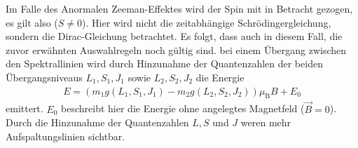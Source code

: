 Im Falle des Anormalen Zeeman-Effektes wird der Spin mit in Betracht gezogen, es
gilt also ($S \neq \num{0}$). Hier wird nicht die zeitabhängige Schrödingergleichung,
sondern die Dirac-Gleichung betrachtet. Es folgt, dass auch in diesem Fall, die
zuvor erwähnten Auswahlregeln noch gültig sind.
bei einem Übergang zwischen den Spektrallinien wird durch Hinzunahme der Quantenzahlen
der beiden Übergangsniveaus $L_1, S_1, J_1$ sowie $L_2, S_2, J_2$  die Energie
\begin{align}
  E = \left(m_1 g(L_1, S_1, J_1) - m_2 g(L_2, S_2, J_2) \right)\mu_\text{B} B + E_0
\end{align}
emittert. $E_0$ beschreibt hier die Energie ohne angelegtes Magnetfeld ($\vec{B} = \num{0}$).
Durch die Hinzunahme der Quantenzahlen $L, S$ und $J$ weren mehr Aufspaltungslinien
sichtbar.
